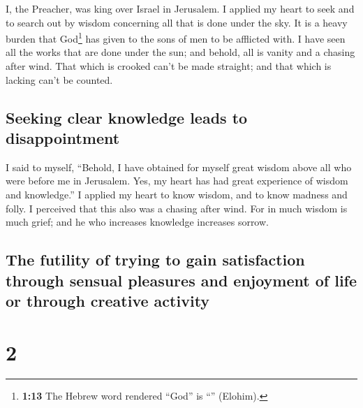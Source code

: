  I, the Preacher, was king over Israel in Jerusalem.
 I applied my heart to seek and to search out by wisdom
concerning all that is done under the sky. It is a heavy burden that
God\footnote{\textbf{1:13} The Hebrew word rendered ``God'' is
  ``'' (Elohim).} has given to the sons of men to be
afflicted with.  I have seen all the works that are done
under the sun; and behold, all is vanity and a chasing after wind.
 That which is crooked can't be made straight; and that
which is lacking can't be counted.

\hypertarget{seeking-clear-knowledge-leads-to-disappointment}{%
\subsection{Seeking clear knowledge leads to
disappointment}\label{seeking-clear-knowledge-leads-to-disappointment}}

 I said to myself, ``Behold, I have obtained for myself
great wisdom above all who were before me in Jerusalem. Yes, my heart
has had great experience of wisdom and knowledge.''  I
applied my heart to know wisdom, and to know madness and folly. I
perceived that this also was a chasing after wind.  For
in much wisdom is much grief; and he who increases knowledge increases
sorrow.

\hypertarget{the-futility-of-trying-to-gain-satisfaction-through-sensual-pleasures-and-enjoyment-of-life-or-through-creative-activity}{%
\subsection{The futility of trying to gain satisfaction through sensual
pleasures and enjoyment of life or through creative
activity}\label{the-futility-of-trying-to-gain-satisfaction-through-sensual-pleasures-and-enjoyment-of-life-or-through-creative-activity}}

\hypertarget{section-1}{%
\section{2}\label{section-1}}

